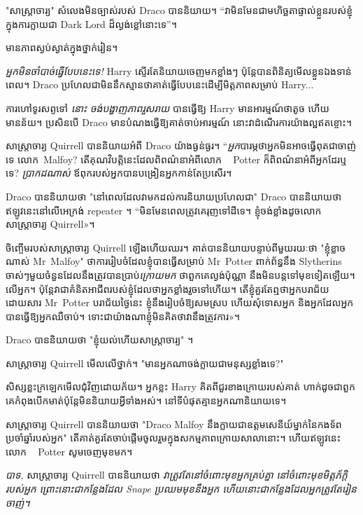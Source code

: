 {{{{{"សាស្រ្តាចារ្យ" សំលេងមិនច្បាស់របស់ Draco បាននិយាយ។ “វាមិនមែនជាមហិច្ឆតាផ្ទាល់ខ្លួនរបស់ខ្ញុំក្នុងការក្លាយជា Dark Lord ដ៏ល្ងង់ខ្លៅនោះទេ”។

មានភាពស្ងប់ស្ងាត់ក្នុងថ្នាក់រៀន។

\emph{អ្នកមិនចាំបាច់ធ្វើបែបនេះទេ!} Harry ស្ទើរតែនិយាយចេញមកខ្លាំងៗ ប៉ុន្តែបានពិនិត្យមើលខ្លួនឯងទាន់ពេល។ Draco ប្រហែលជាមិននឹកស្មានថាគាត់ធ្វើបែបនេះដើម្បីមិត្តភាពសម្រាប់ Harry...

ការហៅទូរសព្ទទៅ \emph{នោះ} \emph{ចង់បង្ហាញភាពរួសរាយ} បានធ្វើឱ្យ Harry មានអារម្មណ៍ថាតូច ហើយមានន័យ។ ប្រសិនបើ Draco មានបំណងធ្វើឱ្យគាត់ចាប់អារម្មណ៍ នោះវាដំណើរការយ៉ាងល្អឥតខ្ចោះ។

សាស្រ្តាចារ្យ Quirrell បាននិយាយអំពី Draco យ៉ាងធ្ងន់ធ្ងរ។ “\emph{អ្នក}បារម្ភថាអ្នកមិនអាចធ្វើពុតជាចាញ់ទេ លោក~Malfoy? តើគុណវិបត្តិនេះដែលពិពណ៌នាអំពីលោក ~ Potter ក៏ពិពណ៌នាអំពីអ្នកដែរឬទេ? \emph{ប្រាកដណាស់} ឪពុករបស់អ្នកបានបង្រៀនអ្នកកាន់តែប្រសើរ។

Draco បាននិយាយថា "នៅពេលដែលវាមកដល់ការនិយាយប្រហែលជា" Draco បាននិយាយថាឥឡូវនេះនៅលើអេក្រង់ repeater ។ “មិនមែន​ពេល​ត្រូវ​គេ​រុញ​ទៅ​ដី​ទេ។ ខ្ញុំ​ចង់​ខ្លាំង​ដូច​លោក​សាស្ត្រាចារ្យ Quirrell»។

ចិញ្ចើម​របស់​សាស្ត្រាចារ្យ Quirrell ឡើង​ហើយ​ឈរ។ គាត់បាននិយាយបន្ទាប់ពីមួយរយៈថា "ខ្ញុំខ្លាចណាស់ Mr~Malfoy" ថាការរៀបចំដែលខ្ញុំបានធ្វើសម្រាប់ Mr~Potter ពាក់ព័ន្ធនឹង Slytherins ចាស់ៗមួយចំនួនដែលនឹងត្រូវបានប្រាប់\emph{ក្រោយមក} ថាពួកគេល្ងង់ប៉ុណ្ណា នឹងមិនបន្តទៅមុខទៀតឡើយ។ លើអ្នក។ ប៉ុន្តែ​វា​ជា​គំនិត​អាជីព​របស់​ខ្ញុំ​ដែល​ថា​អ្នក​ខ្លាំង​រួច​ទៅ​ហើយ។ តើខ្ញុំគួរតែឮថាអ្នកបរាជ័យ ដោយសារ Mr~Potter បរាជ័យថ្ងៃនេះ ខ្ញុំនឹងរៀបចំឱ្យសមស្រប ហើយសុំទោសអ្នក និងអ្នកដែលអ្នកបានធ្វើឱ្យអ្នកឈឺចាប់។ ទោះ​ជា​យ៉ាង​ណា​ខ្ញុំ​មិន​គិត​ថា​វា​នឹង​ត្រូវ​ការ»។

Draco បាននិយាយថា "ខ្ញុំយល់ហើយសាស្រ្តាចារ្យ" ។

សាស្រ្តាចារ្យ Quirrell មើលលើថ្នាក់។ "មានអ្នកណាចង់ក្លាយជាមនុស្សខ្លាំងទេ?"

សិស្សខ្លះក្រឡេកមើលជុំវិញដោយភ័យ។ អ្នកខ្លះ Harry គិតពីជួរខាងក្រោយរបស់គាត់ ហាក់ដូចជាពួកគេកំពុងបើកមាត់ប៉ុន្តែមិននិយាយអ្វីទាំងអស់។ នៅ​ទី​បំផុត​គ្មាន​អ្នក​ណា​និយាយ​ទេ។

សាស្រ្តាចារ្យ Quirrell បាននិយាយថា "Draco Malfoy នឹងក្លាយជាឧត្តមសេនីយ៍ម្នាក់នៃកងទ័ពប្រចាំឆ្នាំរបស់អ្នក" តើគាត់គួរតែចាប់ផ្តើមចូលរួមក្នុងសកម្មភាពក្រោយសាលានោះ។ ហើយឥឡូវនេះ លោក ~ Potter សូមចេញមុខមក។

\later

\emph{បាទ,} សាស្រ្តាចារ្យ Quirrell បាននិយាយថា \emph{វាត្រូវតែនៅចំពោះមុខអ្នកគ្រប់គ្នា នៅចំពោះមុខមិត្តភ័ក្តិរបស់អ្នក ព្រោះនោះជាកន្លែងដែល Snape ប្រឈមមុខនឹងអ្នក ហើយនោះជាកន្លែងដែលអ្នកត្រូវតែរៀនចាញ់។}

}}}}}
